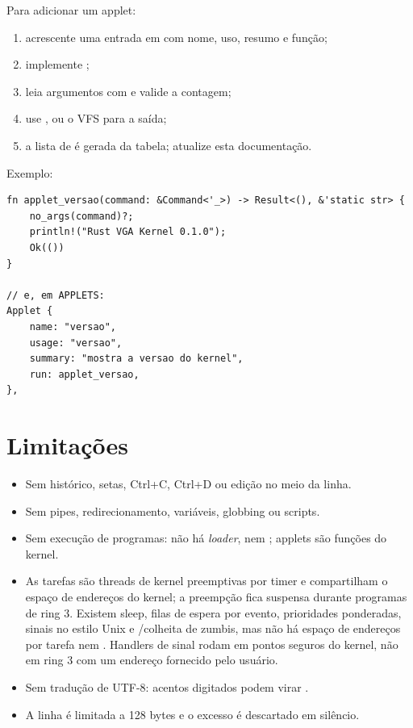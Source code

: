 Para adicionar um applet:

\begin{enumerate}
  \item acrescente uma entrada  em  com nome, uso,
        resumo e fun\c{c}\~ao;
  \item implemente ;
  \item leia argumentos com  e valide a contagem;
  \item use ,  ou o VFS para a sa\'ida;
  \item a lista de  \'e gerada da tabela; atualize esta
        documenta\c{c}\~ao.
\end{enumerate}

Exemplo:

\begin{lstlisting}[caption={Esqueleto de um novo applet.},label={lst:novocomando}]
fn applet_versao(command: &Command<'_>) -> Result<(), &'static str> {
    no_args(command)?;
    println!("Rust VGA Kernel 0.1.0");
    Ok(())
}

// e, em APPLETS:
Applet {
    name: "versao",
    usage: "versao",
    summary: "mostra a versao do kernel",
    run: applet_versao,
},
\end{lstlisting}

\section{Limita\c{c}\~oes}

\begin{itemize}
  \item Sem hist\'orico, setas, Ctrl+C, Ctrl+D ou edi\c{c}\~ao no meio da
        linha.
  \item Sem pipes, redirecionamento, vari\'aveis, globbing ou scripts.
  \item Sem execu\c{c}\~ao de programas: n\~ao h\'a \emph{loader},
         nem ; applets s\~ao fun\c{c}\~oes do kernel.
  \item As tarefas s\~ao threads de kernel preemptivas por timer e
        compartilham o espa\c{c}o de endere\c{c}os do kernel; a
        preemp\c{c}\~ao fica suspensa durante programas de ring 3. Existem
        sleep, filas de espera por evento, prioridades ponderadas, sinais no
        estilo Unix e /colheita de zumbis, mas n\~ao h\'a
        espa\c{c}o de endere\c{c}os por tarefa nem . Handlers de
        sinal rodam em pontos seguros do kernel, n\~ao em ring 3 com um
        endere\c{c}o fornecido pelo usu\'ario.
  \item Sem tradu\c{c}\~ao de UTF-8: acentos digitados podem virar .
  \item A linha \'e limitada a 128 bytes e o excesso \'e descartado em
        sil\^encio.
\end{itemize}

